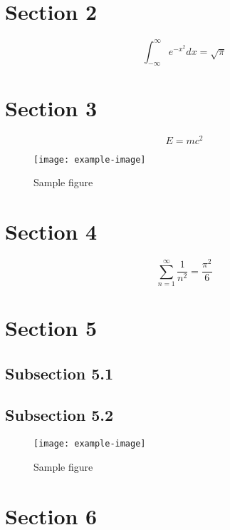 \documentclass{article}
\begin{document}
\section{Section 2}

\begin{equation}
    \int_{-\infty}^{\infty} e^{-x^2} dx = \sqrt{\pi}
\end{equation}

\section{Section 3}

\begin{equation}
    E = mc^2
\end{equation}

\begin{figure}[h]
    \centering
    \texttt{[image: example-image]}
    \caption{Sample figure}
    \label{fig:sample}
\end{figure}

\section{Section 4}

\begin{equation}
    \sum_{n=1}^{\infty} \frac{1}{n^2} = \frac{\pi^2}{6}
\end{equation}

\section{Section 5}

\subsection{Subsection 5.1}

\subsection{Subsection 5.2}

\begin{figure}[h]
    \centering
    \texttt{[image: example-image]}
    \caption{Sample figure}
    \label{fig:sample}
\end{figure}

\section{Section 6}
\end{document}

